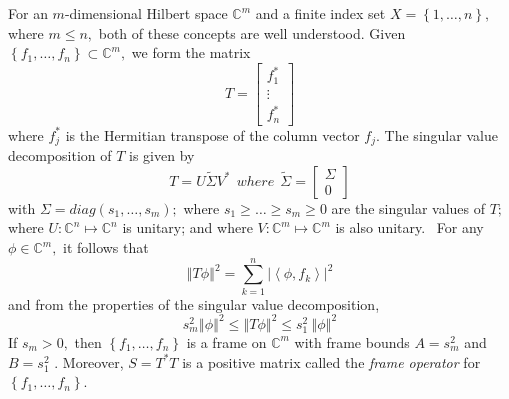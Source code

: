 \documentclass{article}
\begin{document}
For an $m$-dimensional Hilbert space $\mathbb{C}^{m}$ and a finite index set $X=\left\{ 1,\ldots ,n\right\} ,$ where $m\leq n,$ both of these concepts are well understood. Given 
$\left\{ f_{1},\ldots ,f_{n}\right\} \subset \mathbb{C}^{m},$ 
we form the matrix 
$$
T=\left[  \begin{array}{c}
              f_{1}^{\ast } \\ 
              \vdots        \\ 
              f_{n}^{\ast }
          \end{array}
\right] 
$$
where $f_{j}^{\ast }$ is the Hermitian transpose of the column vector $f_{j}.$ The singular value decomposition of $T$ is given by 
$$
T=U\tilde{\Sigma}V^{\ast }\ \ where\ \ \tilde{\Sigma}=
\left[  \begin{array}{c}
                \Sigma  \\ 
                  0
        \end{array}
\right] 
$$
with $\Sigma =diag\left( s_{1},\ldots ,s_{m}\right);$ where $s_{1}\geq \ldots \geq s_{m}\geq 0$ are the singular values of $T;$ where $U:\mathbb{C}^{n}\mapsto \mathbb{C}^{n}$ is unitary; and where $V:\mathbb{C}^{m}\mapsto \mathbb{C}^{m}$ is also unitary. \ For any $\phi \in \mathbb{C}^{m},$ it follows that
$$
\left\Vert T\phi \right\Vert ^{2}=\sum_{k=1}^{n}\left\vert \left\langle \phi, f_{k}\right\rangle \right\vert ^{2}
$$
and from the properties of the singular value decomposition, 
$$s_{m}^{2}\left\Vert \phi \right\Vert ^{2}\leq \left\Vert T\phi \right\Vert^{2}\leq s_{1}^{2}\ \left\Vert \phi \right\Vert ^{2}$$
If $s_{m}>0,$ then $\left\{ f_{1},\ldots ,f_{n}\right\} $ is a frame on $\mathbb{C}^{m}$ with frame bounds $A=s_{m}^{2}$ and $B=s_{1}^{2}$  \cite{casazza2013introduction,aldroubi2007optimal}. Moreover, $S=T^{\ast }T$ is a positive matrix called the \emph{frame operator} for $\left\{ f_{1},\ldots ,f_{n}\right\} $. 
\end{document}
